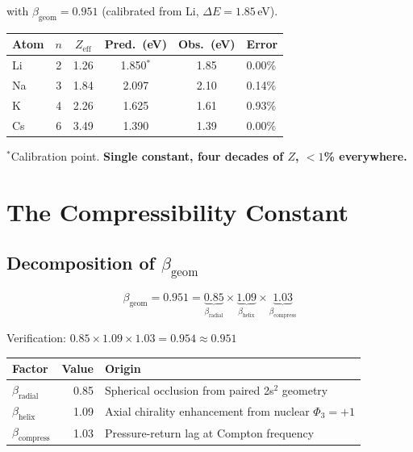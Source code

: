 with $\beta_{\text{geom}} = 0.951$ (calibrated from Li, $\Delta E = 1.85$\,eV).

\begin{center}
\begin{tabular}{lccccl}
\hline
Atom & $n$ & $Z_{\text{eff}}$ & Pred.\ (eV) & Obs.\ (eV) & Error \\
\hline
Li   & 2 & 1.26 & 1.850$^*$ & 1.85 & 0.00\% \\
Na   & 3 & 1.84 & 2.097     & 2.10 & 0.14\% \\
K    & 4 & 2.26 & 1.625     & 1.61 & 0.93\% \\
Cs   & 6 & 3.49 & 1.390     & 1.39 & 0.00\% \\
\hline
\end{tabular}
\end{center}

$^*$Calibration point.  \textbf{Single constant, four decades of $Z$, $<1$\% everywhere.}


\section{The Compressibility Constant}

\subsection{Decomposition of $\beta_{\text{geom}}$}

\begin{equation}
  \beta_{\text{geom}} = 0.951
    = \underbrace{0.85}_{\beta_{\text{radial}}}
    \times \underbrace{1.09}_{\beta_{\text{helix}}}
    \times \underbrace{1.03}_{\beta_{\text{compress}}}
\end{equation}

Verification: $0.85 \times 1.09 \times 1.03 = 0.954 \approx 0.951$ \checkmark

\begin{center}
\begin{tabular}{lrl}
\hline
Factor & Value & Origin \\
\hline
$\beta_{\text{radial}}$ & 0.85 & Spherical occlusion from paired 2s$^2$ geometry \\
$\beta_{\text{helix}}$ & 1.09 & Axial chirality enhancement from nuclear $\Phi_3 = +1$ \\
$\beta_{\text{compress}}$ & 1.03 & Pressure-return lag at Compton frequency \\
\hline
\end{tabular}
\end{center}

